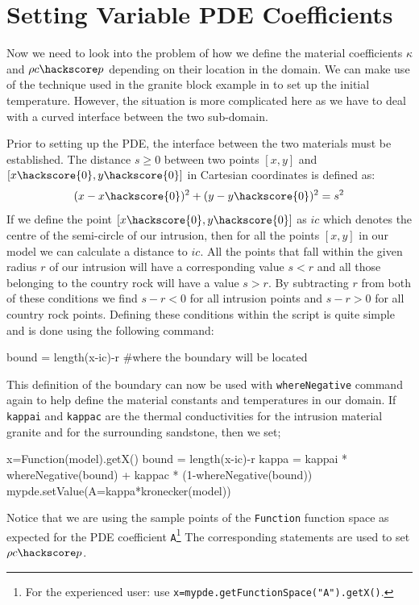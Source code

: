 \section{Setting Variable PDE Coefficients}
Now we need to look into the problem of how we define the material coefficients
$\kappa$ and $\rho c\hackscore p$ depending on their location in the domain. 
We can make use of the technique used in the granite block example in 
to set up the initial temperature. However,
the situation is more complicated here as we have to deal with a
curved interface between the two sub-domain.

Prior to setting up the PDE, the interface between the two materials must be established. 
The distance $s\ge 0$ between two points $[x,y]$ and $[x\hackscore{0},y\hackscore{0}]$ in Cartesian coordinates is defined as:
\begin{equation}
 (x-x\hackscore{0})^{2}+(y-y\hackscore{0})^{2} = s^{2}
\end{equation}
If we define the point $[x\hackscore{0},y\hackscore{0}]$ as $ic$ which denotes the centre of the semi-circle of our intrusion, then for all the points $[x,y]$ in our model we can calculate a distance to $ic$. 
All the points that fall within the given radius $r$ of our intrusion will have a corresponding 
value $s < r$ and all those belonging to the country rock will have a value $s > r$. By subtracting $r$ from both of these conditions we find $s-r < 0$ for all intrusion points and $s-r > 0$ 
for all country rock points. 
Defining these conditions within the script is quite simple and is done using the following command:
\begin{python}
 bound = length(x-ic)-r #where the boundary will be located
\end{python}
This definition of the boundary can now be used with \verb|whereNegative| command again to help define the material constants and temperatures in our domain. 
If \verb|kappai| and \verb|kappac| are the 
thermal conductivities for the intrusion material granite and for the surrounding sandstone, then we set; 
\begin{python}
x=Function(model).getX()
bound = length(x-ic)-r
kappa = kappai * whereNegative(bound) + kappac * (1-whereNegative(bound))
mypde.setValue(A=kappa*kronecker(model))
\end{python}
Notice that we are using the sample points of the \verb|Function| function space as expected for the 
PDE coefficient \verb|A|\footnote{For the experienced user: use \texttt{x=mypde.getFunctionSpace("A").getX()}.}
The corresponding statements are used to set $\rho c\hackscore p$. 

